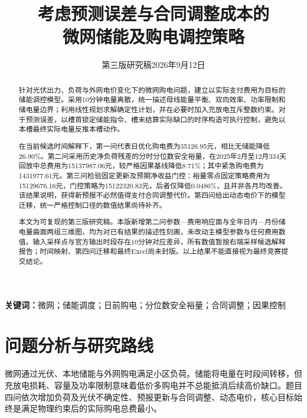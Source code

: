 \documentclass[UTF8,a4paper,zihao=-4,fontset=fandol]{ctexart}
\title{考虑预测误差与合同调整成本的\\微网储能及购电调控策略}
\author{}\date{第三版研究稿\quad 2026年9月12日}
\begin{document}
\maketitle\vspace{-2em}
\begin{abstract}
针对光伏出力、负荷与外网电价变化下的微网购电问题，建立以实际支付费用为目标的储能调控模型。采用10分钟电量离散，统一描述母线能量平衡、双向效率、功率限制和储电量边界；利用线性规划求解确定性计划，并在必要时加入充放电互斥整数约束。对于预测误差，以槽首锁定储能指令、槽末结算实际缺口的时序构造可执行控制，避免以本槽最终实际电量反推本槽动作。

在当前候选时间解释下，第一问代表日优化购电费为35126.95元，相比无储能降低26.90\%。第二问采用历史净负荷残差的分时分位数安全裕量，在2025年2月至12月334天回放中总费用为15137987.06元，较严格因果基线降低8.71\%；其中紧急购电费为1431977.61元。第三问检验固定更新及预期净收益门控：裕量零点固定策略费用为15129676.16元，门控策略为15122320.83元，后者仅降低0.0486\%，且并非各月均改善。该结果说明，获得新预报不必然值得支付合同调整代价。第四问给出动态电价下的模型迁移，统一严格控制口径的数值结果尚待补齐。

本文为可复现的第三版研究稿。本版新增第二问参数—费用响应面与全年日内—月份储电量曲面两组三维图，均为对已有结果的描述性刻画，未改动主模型参数与任何费用数值。输入采样点与官方输出时段存在10分钟对应差异，所有数值暂按右端采样候选解释报告；时间映射、第四问迁移和最终Excel尚未封版。以上结果不能直接视为最终竞赛提交结论。
\end{abstract}
\noindent\textbf{关键词：}微网；储能调度；日前购电；分位数安全裕量；合同调整；因果控制
\newpage
\section{问题分析与研究路线}
微网通过光伏、本地储能与外网购电满足小区负荷。储能将电量在时段间转移，但充放电损耗、容量及功率限制意味着低价多购电并不总能抵消后续高价缺口。题目四问依次增加负荷及光伏不确定性、预报更新与合同调整、动态电价，核心目标始终是满足物理约束后的实际购电总费最小\cite{problem}。
\end{document}
